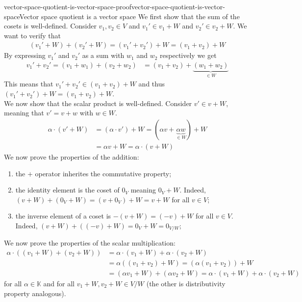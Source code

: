 \documentclass[preview]{standalone}
\begin{document}
\begin{snippetproof}{vector-space-quotient-is-vector-space-proof}{vector-space-quotient-is-vector-space}{Vector space quotient is a vector space}
    We first show that the sum of the cosets is well-defined.
    Consider \(v_1, v_2 \in V\) and \(v_1' \in v_1 + W\) and \(v_2' \in v_2 + W\).
    We want to verify that
    \begin{align*}
        \left(v_1' + W\right) + 
        \left(v_2' + W\right)
        = (v_1' + v_2') + W = (v_1 + v_2) + W
    \end{align*}
    By expressing \(v_1'\) and \(v_2'\) as a sum with \(w_1\) and \(w_2\) respectively we get
    \begin{align*}
        v_1' + v_2' = (v_1 + w_1) + (v_2 + w_2) &= (v_1 + v_2) + \underbrace{(w_1 + w_2)}_{\in W}
    \end{align*}
    This means that \(v_1' + v_2' \in (v_1 + v_2) + W\)
    and thus \((v_1' + v_2') + W = (v_1 + v_2) + W\). \\
    We now show that the scalar product is well-defined.
    Consider \(v' \in v + W\), meaning that \(v' = v + w\) with \(w \in W\).
    \begin{align*}
        \alpha \cdot (v' + W) &= (\alpha \cdot v') + W = (\alpha v + \underbrace{\alpha w}_{\in W}) + W \\
        &= \alpha v + W = \alpha \cdot \left(v + W\right)
    \end{align*}
    We now prove the properties of the addition:
    \begin{enumerate}
        \item the \(+\) operator inherites the commutative property;
        \item the identity element is the coset of \(0_V\) meaning \(0_V + W\).
        Indeed, \((v + W) + (0_V + W) = (v + 0_V) + W = v + W\) for all \(v \in V\);
        \item the inverse element of a coset is \(-(v+W) = (-v) + W\) for all \(v \in V\).
        Indeed, \((v + W) + \left((-v) + W\right) = 0_V + W = 0_{V/W}\);
    \end{enumerate}
    We now prove the properties of the scalar multiplication:
    \begin{align*}
        \alpha \cdot \left((v_1 + W) + (v_2 + W)\right)
        &= \alpha \cdot (v_1 + W) + \alpha \cdot (v_2 + W) \\
        &= \alpha \left((v_1 + v_2) + W\right)
        = \left(\alpha(v_1 + v_2)\right) + W \\
        &= \left(\alpha v_1 + W\right)
        + \left(\alpha v_2 + W\right) = \alpha \cdot (v_1 + W) + \alpha \cdot (v_2 + W)
    \end{align*}
    for all \(\alpha \in \mathbb{K}\) and for all \(v_1 + W, v_2 + W \in V/W\)
    (the other is distributivity property analogous).
\end{snippetproof}
\end{document}
